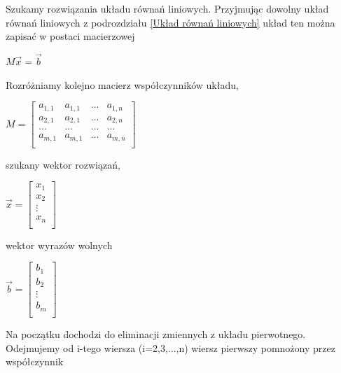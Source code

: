 \documentclass{article}
\begin{document}
Szukamy rozwiązania układu równań liniowych. Przyjmując dowolny układ równań liniowych z podrozdziału \ref{Układ równań liniowych} układ ten można zapisać w postaci macierzowej
\begin{center}
    \begin{math}
    M\overrightarrow{x}=\overrightarrow{b}
    \end{math}
\end{center}
\newpage

Rozróżniamy kolejno macierz współczynników układu, 
\begin{center}
    \begin{math}
    M=
    \left[
  \begin{matrix}
    a_{1,1} & a_{1,1} & ... & a_{1,n} \\
    a_{2,1} & a_{2,1} & ... & a_{2,n} \\
    ... & ... & ... & ... \\
    a_{m,1} & a_{m,1} & ... & a_{m,n} \\
  \end{matrix}
  \right]
    \end{math}
\end{center}
szukany wektor rozwiązań,
\begin{center}
    \begin{math}
    \overrightarrow{x} =
    \left[
  \begin{matrix}
    x_{1}  \\
    x_{2}  \\
    \vdots   \\
    x_{n}  \\
  \end{matrix}
  \right]
    \end{math}
\end{center}
wektor wyrazów wolnych 
\begin{center}
    \begin{math}
    \overrightarrow{b} =
    \left[
  \begin{matrix}
    b_{1}  \\
    b_{2}  \\
    \vdots   \\
    b_{m}  \\
  \end{matrix}
  \right]
    \end{math}
\end{center}
Na początku dochodzi do eliminacji zmiennych z układu pierwotnego. Odejmujemy od i-tego wiersza (i=2,3,...,n) wiersz
pierwszy pomnożony przez współczynnik
\end{document}
